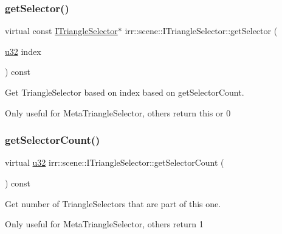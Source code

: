 \subsubsection{\texorpdfstring{get\+Selector()}{getSelector()}\hspace{0.1cm}{\footnotesize\ttfamily [2/2]}}
{\footnotesize\ttfamily virtual const \hyperlink{classirr_1_1scene_1_1ITriangleSelector}{I\+Triangle\+Selector}$\ast$ irr\+::scene\+::\+I\+Triangle\+Selector\+::get\+Selector (\begin{DoxyParamCaption}\item[{\hyperlink{namespaceirr_a0416a53257075833e7002efd0a18e804}{u32}}]{index }\end{DoxyParamCaption}) const\hspace{0.3cm}{\ttfamily [pure virtual]}}



Get Triangle\+Selector based on index based on get\+Selector\+Count. 

Only useful for Meta\+Triangle\+Selector, others return \textquotesingle{}this\textquotesingle{} or 0 \mbox{\label{classirr_1_1scene_1_1ITriangleSelector_ae0d51279cab70e31a6aa2646e3b05df4}} 
\subsubsection{\texorpdfstring{get\+Selector\+Count()}{getSelectorCount()}}
{\footnotesize\ttfamily virtual \hyperlink{namespaceirr_a0416a53257075833e7002efd0a18e804}{u32} irr\+::scene\+::\+I\+Triangle\+Selector\+::get\+Selector\+Count (\begin{DoxyParamCaption}{ }\end{DoxyParamCaption}) const\hspace{0.3cm}{\ttfamily [pure virtual]}}



Get number of Triangle\+Selectors that are part of this one. 

Only useful for Meta\+Triangle\+Selector, others return 1 \mbox{\label{classirr_1_1scene_1_1ITriangleSelector_a63b547218902d57a44357d3a246e5070}} 

